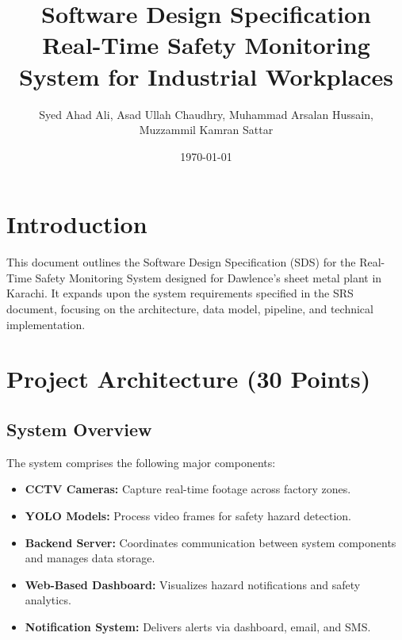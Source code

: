 \documentclass[12pt]{article}
\title{Software Design Specification \\ \large Real-Time Safety Monitoring System for Industrial Workplaces}
\author{Syed Ahad Ali, Asad Ullah Chaudhry, Muhammad Arsalan Hussain, \\ Muzzammil Kamran Sattar}
\date{\today}
\begin{document}
\maketitle
\tableofcontents
\newpage

\section{Introduction}
This document outlines the Software Design Specification (SDS) for the Real-Time Safety Monitoring System designed for Dawlence’s sheet metal plant in Karachi. It expands upon the system requirements specified in the SRS document, focusing on the architecture, data model, pipeline, and technical implementation.

\section{Project Architecture (30 Points)}
\subsection{System Overview}
The system comprises the following major components:
\begin{itemize}
    \item \textbf{CCTV Cameras:} Capture real-time footage across factory zones.
    \item \textbf{YOLO Models:} Process video frames for safety hazard detection.
    \item \textbf{Backend Server:} Coordinates communication between system components and manages data storage.
    \item \textbf{Web-Based Dashboard:} Visualizes hazard notifications and safety analytics.
    \item \textbf{Notification System:} Delivers alerts via dashboard, email, and SMS.
\end{itemize}
\end{document}
